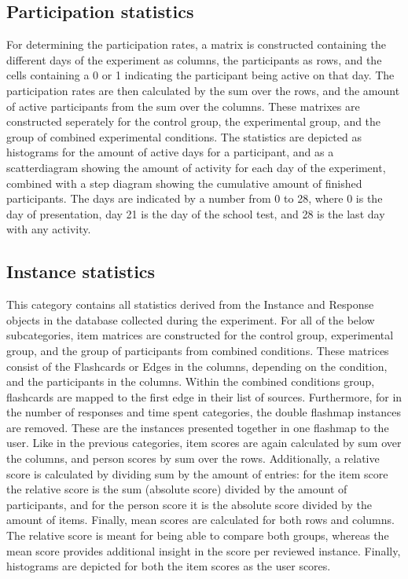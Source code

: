 \subsection{Participation statistics}

For determining the participation rates, a matrix is constructed containing the different days of the experiment as columns, the participants as rows, and the cells containing a 0 or 1 indicating the participant being active on that day. The participation rates are then calculated by the sum over the rows, and the amount of active participants from the sum over the columns. These matrixes are constructed seperately for the control group, the experimental group, and the group of combined experimental conditions. The statistics are depicted as histograms for the amount of active days for a participant, and as a scatterdiagram showing the amount of activity for each day of the experiment, combined with a step diagram showing the cumulative amount of finished participants. The days are indicated by a number from 0 to 28, where 0 is the day of presentation, day 21 is the day of the school test, and 28 is the last day with any activity.

\subsection{Instance statistics}

This category contains all statistics derived from the Instance and Response objects in the database collected during the experiment. For all of the below subcategories, item matrices are constructed for the control group, experimental group, and the group of participants from combined conditions. These matrices consist of the Flashcards or Edges in the columns, depending on the condition, and the participants in the columns. Within the combined conditions group, flashcards are mapped to the first edge in their list of sources. Furthermore, for in the number of responses and time spent categories, the double flashmap instances are removed. These are the instances presented together in one flashmap to the user. Like in the previous categories, item scores are again calculated by sum over the columns, and person scores by sum over the rows. Additionally, a relative score is calculated by dividing sum by the amount of entries: for the item score the relative score is the sum (absolute score) divided by the amount of participants, and for the person score it is the absolute score divided by the amount of items. Finally, mean scores are calculated for both rows and columns. The relative score is meant for being able to compare both groups, whereas the mean score provides additional insight in the score per reviewed instance. Finally, histograms are depicted for both the item scores as the user scores.

